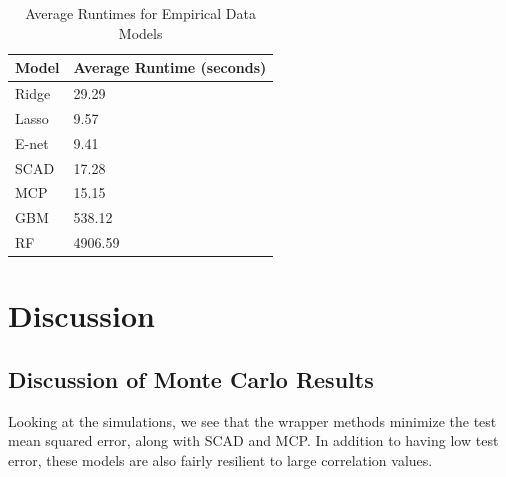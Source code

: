 \documentclass{article}
\begin{document}
\begin{table}[h!]
	\centering
	\caption{Average Runtimes for Empirical Data Models}
	\label{tab:emp_runtimes}
	\begin{tabular}{ll}
		\hline
		\textbf{Model}        & \textbf{Average Runtime} (seconds) \\ \hline
		Ridge         & 29.29               \\
		Lasso         & 9.57                \\
		E-net	      & 9.41                \\
		SCAD          & 17.28               \\
		MCP           & 15.15               \\
		GBM      	  & 538.12              \\
		RF 			  & 4906.59             \\ \hline
	\end{tabular}
\end{table}

\section{Discussion}
\subsection{Discussion of Monte Carlo Results}
Looking at the simulations, we see that the wrapper methods minimize the test mean squared error, along with SCAD and MCP. In addition to having low test error, these models are also fairly resilient to large correlation values.

\end{document}
